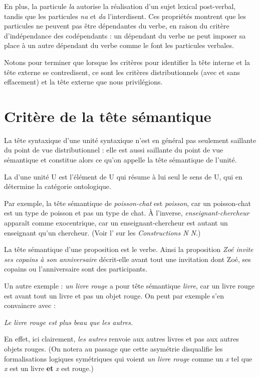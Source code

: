 En plus, la particule \textit{la} autorise la réalisation d’un sujet lexical post-verbal, tandis que les particules \textit{na} et \textit{da} l’interdisent. Ces propriétés montrent que les particules ne peuvent pas être dépendantes du verbe, en raison du critère d’indépendance des codépendants : un dépendant du verbe ne peut imposer sa place à un autre dépendant du verbe comme le font les particules verbales.

Notons pour terminer que lorsque les critères pour identifier la tête interne et la tête externe se contredisent, ce sont les critères distributionnels (avec et sans effacement) et la tête externe que nous privilégions.

\section{Critère de la tête sémantique}\label{sec:3.3.17}

La tête syntaxique d’une unité syntaxique n’est en général pas seulement saillante du point de vue distributionnel : elle est aussi saillante du point de vue sémantique et constitue alors ce qu’on appelle la tête sémantique de l’unité.

{La  d’une unité U est l’élément de U qui résume à lui seul le sens de U, qui en détermine la catégorie ontologique.}

Par exemple, la tête sémantique de \textit{poisson-chat} est \textit{poisson}, car un poisson-chat est un type de poisson et pas un type de chat. À l’inverse, \textit{enseignant-chercheur} apparaît comme exocentrique, car un enseignant-chercheur est autant un enseignant qu’un chercheur. (Voir l’ sur les \textit{Constructions N N}.)

La tête sémantique d’une proposition est le verbe. Ainsi la proposition \textit{Zoé invite ses copains à son anniversaire} décrit-elle avant tout une invitation dont Zoé, ses copains ou l’anniversaire sont des participants.

Un autre exemple : \textit{un livre rouge} a pour tête sémantique \textit{livre}, car un livre rouge est avant tout un livre et pas un objet rouge. On peut par exemple s’en convaincre avec :

\ea
    \textit{{Le livre rouge est plus beau que les autres.}}
\z

En effet, ici clairement, \textit{les autres} renvoie aux autres livres et pas aux autres objets rouges. (On notera au passage que cette asymétrie disqualifie les formalisations logiques symétriques qui voient \textit{un livre rouge} comme un \textit{x} tel que \textit{x} est un livre \textbf{et} \textit{x} est rouge.) 

